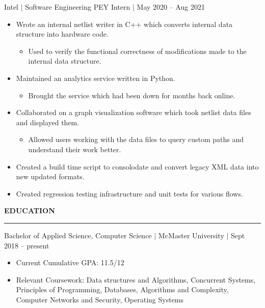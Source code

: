 \documentclass[12pt]{article}
\newcommand{\sectionRule}{\textcolor{gray}{\rule{7.27in}{0.02cm}}}
\newcommand{\sectionTxt}[1]{\noindent\textbf{#1}\\}
\newcommand{\textDate}[3]{\noindent#1 $|$ #2 $|$ {\color{textGray} #3}}
\begin{document}
    \textDate{Intel}{Software Engineering PEY Intern}{May 2020 -- Aug 2021}
    \begin{small}
        \begin{itemize}
            \itemsep0em 
            \item {\color{textGray} Wrote an internal netlist writer in C++ which converts internal data structure into hardware code.}
                \begin{itemize}[label=$\circ$,topsep=-5px,partopsep=0px]
                    \itemsep0em 
                    \item {\color{textGray} Used to verify the functional correctness of modifications made to the internal data structure.}
                \end{itemize}
            \item {\color{textGray} Maintained an analytics service written in Python.}
                \begin{itemize}[label=$\circ$,topsep=-5px,partopsep=0px]
                    \itemsep0em 
                    \item {\color{textGray} Brought the service which had been down for months back online.}
                \end{itemize}
            \item {\color{textGray} Collaborated on a graph visualization software which took netlist data files and displayed them.}
                \begin{itemize}[label=$\circ$,topsep=-5px,partopsep=0px]
                    \itemsep0em 
                    \item {\color{textGray} Allowed users working with the data files to query custom paths and understand their work better.}
                \end{itemize}
            \item {\color{textGray} Created a build time script to consolodate and convert legacy XML data into new updated formats.}
            \item {\color{textGray} Created regression testing infrastructure and unit tests for various flows.}
        \end{itemize}
    \end{small}

    \sectionTxt{EDUCATION}
    \sectionRule

    \textDate{Bachelor of Applied Science, Computer Science}{McMaster University}{Sept 2018 -- present}
    \begin{small}
        \begin{itemize}
            \itemsep0em 
            \item Current Cumulative GPA: {\color{textGray} 11.5/12}
            \item Relevant Coursework: {\color{textGray} Data structures and Algorithms, Concurrent Systems, Principles of Programming, Databases, Algorithms and Complexity, Computer Networks and Security, Operating Systems}
        \end{itemize}
    \end{small}
\end{document}
